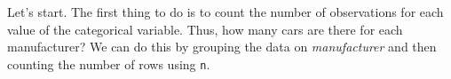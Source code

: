 \documentclass[]{tufte-book}
\newenvironment{Shaded}{}{}
\newcommand{\DataTypeTok}[1]{\textcolor[rgb]{0.56,0.13,0.00}{#1}}
\newcommand{\KeywordTok}[1]{\textcolor[rgb]{0.00,0.44,0.13}{\textbf{#1}}}
\newcommand{\NormalTok}[1]{#1}
\newcommand{\OperatorTok}[1]{\textcolor[rgb]{0.40,0.40,0.40}{#1}}
\newcommand{\StringTok}[1]{\textcolor[rgb]{0.25,0.44,0.63}{#1}}
\begin{document}
Let's start. The first thing to do is to count the number of observations for each value of the categorical variable. Thus, how many cars are there for each manufacturer? We can do this by grouping the data on \emph{manufacturer} and then counting the number of rows using \texttt{n}.

\begin{Shaded}
\end{Shaded}
\end{document}
